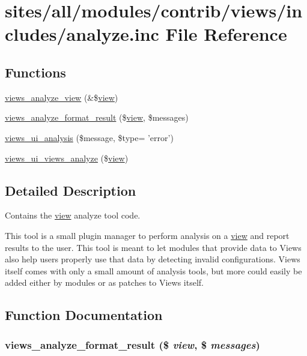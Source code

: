 \hypertarget{analyze_8inc}{
\section{sites/all/modules/contrib/views/includes/analyze.inc File Reference}
\label{analyze_8inc}
}
\subsection*{Functions}
\begin{CompactItemize}
\item 
\hyperlink{analyze_8inc_8f418e18d26fe543f6e960bade40a367}{views\_\-analyze\_\-view} (\&\$\hyperlink{classview}{view})
\item 
\hyperlink{analyze_8inc_bb4831d09ff37091c93536f24729a2ad}{views\_\-analyze\_\-format\_\-result} (\$\hyperlink{classview}{view}, \$messages)
\item 
\hyperlink{analyze_8inc_a4f08098638b001519a0f905b102f22a}{views\_\-ui\_\-analysis} (\$message, \$type= 'error')
\item 
\hyperlink{analyze_8inc_bda4985a58e7461d134687a85c92f65f}{views\_\-ui\_\-views\_\-analyze} (\$\hyperlink{classview}{view})
\end{CompactItemize}


\subsection{Detailed Description}
Contains the \hyperlink{classview}{view} analyze tool code.

This tool is a small plugin manager to perform analysis on a \hyperlink{classview}{view} and report results to the user. This tool is meant to let modules that provide data to Views also help users properly use that data by detecting invalid configurations. Views itself comes with only a small amount of analysis tools, but more could easily be added either by modules or as patches to Views itself. 

\subsection{Function Documentation}
\hypertarget{analyze_8inc_bb4831d09ff37091c93536f24729a2ad}{
\subsubsection[{views\_\-analyze\_\-format\_\-result}]{\setlength{\rightskip}{0pt plus 5cm}views\_\-analyze\_\-format\_\-result (\$ {\em view}, \/  \$ {\em messages})}}
\label{analyze_8inc_bb4831d09ff37091c93536f24729a2ad}


